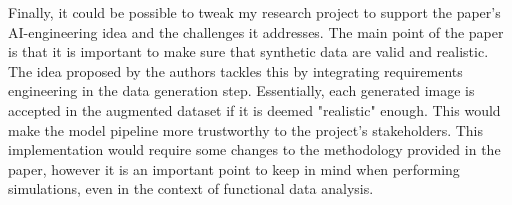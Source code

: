 Finally, it could be possible to tweak my research project to support the paper’s AI-engineering idea and the challenges it addresses. The main point of the paper is that it is important to make sure that synthetic data are valid and realistic. The idea proposed by the authors tackles this by integrating requirements engineering in the data generation step. Essentially, each generated image is accepted in the augmented dataset if it is deemed "realistic" enough. This would make the model pipeline more trustworthy to the project's stakeholders. This implementation would require some changes to the methodology provided in the paper, however it is an important point to keep in mind when performing simulations, even in the context of functional data analysis. 
